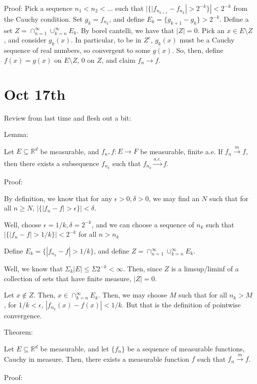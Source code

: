 \documentclass[10pt]{article}
\begin{document}
Proof: Pick a sequence $n_1 < n_2 < ...$ such that $| \{ | f_{n_{k+1}} - f_{n_k} | > 2^{-k} \} | < 2^{-k}$ from the Cauchy condition. Set $g_k = f_{n_k}$, and define $E_k = \{ g_{k+1}  - g_k \} > 2^{-k}$. Define a set $Z = \cap_{n=1}^\infty \cup_{k=n}^\infty E_k$. By borel cantelli, we have that $|Z| = 0$. Pick an $x \in E \setminus Z$, and consider $g_k(x)$. In particular, to be in $Z^c$, $g_k(x)$ must be a Cauchy sequence of real numbers, so convergent to some $g(x)$. So, then, define $f(x) = g(x)$ on $E \setminus Z$, $0$ on $Z$, and claim $f_n \to f$.

\section*{Oct 17th}

Review from last time and flesh out a bit:

Lemma:

Let $E \subseteq \mathbb{R}^d$ be measurable, and $f_n,f: E \to F$ be measurable, finite a.e. If $f_n \xrightarrow[]{m} f$, then there exists a subsequence $f_{n_k}$ such that $f_{n_k} \xrightarrow[]{a.e.} f$.

Proof:

By definition, we know that for any $\epsilon > 0, \delta > 0$, we may find an $N$ such that for all $n \geq N$, $| \{ | f_n - f| > \epsilon \} | < \delta$.

Well, choose $\epsilon = 1/k, \delta = 2^{-k}$, and we can choose a sequence of $n_k$ such that $|\{ | f_n - f| > 1/k \}| < 2^{-k}$ for all $n > n_k$

Define $E_k = \{ | f_{n_k} - f| > 1/k \}$, and define $Z = \cap_{n=1}^\infty \cup_{k=n}^\infty E_k$.

Well, we know that $\Sigma_{k} |E| \leq \Sigma 2^{-k} < \infty$. Then, since $Z$ is a limsup/liminf of a collection of sets that have finite measure, $|Z| = 0$.

Let $x \not \in Z$. Then,  $x  \in \cap_{k=n}^\infty E_k$. Then, we may choose $M$ such that for all $n_k > M$, for $1/k < \epsilon$, $| f_{n_k}(x) - f(x)| < 1/k$. But that is the definition of pointwise convergence.

Theorem:

Let $E \subseteq \mathbb{R}^d$ be measurable, and let $\{ f_n \}$ be a sequence of measurable functions, Cauchy in measure. Then, there exists a measurable function $f$ such that $f_n \xrightarrow[]{m} f$.

Proof:
\end{document}
